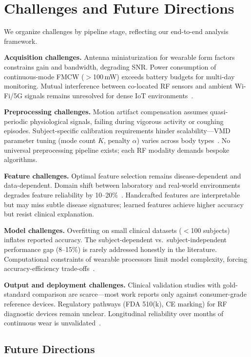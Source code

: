 \documentclass[journal,twoside]{IEEEtran}
\begin{document}
\section{Challenges and Future Directions}

We organize challenges by pipeline stage, reflecting our end-to-end analysis framework.

\textbf{Acquisition challenges.} Antenna miniaturization for wearable form factors constrains gain and bandwidth, degrading SNR. Power consumption of continuous-mode FMCW ($>$100\,mW) exceeds battery budgets for multi-day monitoring. Mutual interference between co-located RF sensors and ambient Wi-Fi/5G signals remains unresolved for dense IoT environments~\cite{ref_rf_exposure2023, ref_rf_fingerprint2023}.

\textbf{Preprocessing challenges.} Motion artifact compensation assumes quasi-periodic physiological signals, failing during vigorous activity or coughing episodes. Subject-specific calibration requirements hinder scalability---VMD parameter tuning (mode count $K$, penalty $\alpha$) varies across body types~\cite{ref_radar_complex2025}. No universal preprocessing pipeline exists; each RF modality demands bespoke algorithms.

\textbf{Feature challenges.} Optimal feature selection remains disease-dependent and data-dependent. Domain shift between laboratory and real-world environments degrades feature reliability by 10--20\%~\cite{ref_comprehensive_dataset2024}. Handcrafted features are interpretable but may miss subtle disease signatures; learned features achieve higher accuracy but resist clinical explanation.

\textbf{Model challenges.} Overfitting on small clinical datasets ($<$100 subjects) inflates reported accuracy. The subject-dependent vs.\ subject-independent performance gap (8--15\%) is rarely addressed honestly in the literature. Computational constraints of wearable processors limit model complexity, forcing accuracy-efficiency trade-offs~\cite{ref_biogap2025, ref_ondevice_eegnet2024}.

\textbf{Output and deployment challenges.} Clinical validation studies with gold-standard comparison are scarce---most work reports only against consumer-grade reference devices. Regulatory pathways (FDA 510(k), CE marking) for RF diagnostic devices remain unclear. Longitudinal reliability over months of continuous wear is unvalidated~\cite{ref_wearable_cardio2025}.

\subsection{Future Directions}
\end{document}
